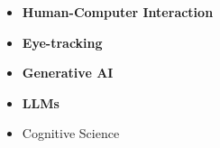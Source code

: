 \vspace{0.1cm}
\vspace{1em}

\begin{itemize}
    \item \textbf{Human-Computer Interaction}
    \item \textbf{Eye-tracking}
    \item \textbf{Generative AI}
    \item \textbf{LLMs}
    \item Cognitive Science
    
\end{itemize}